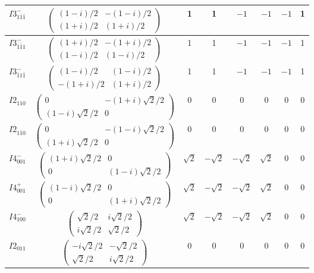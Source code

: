 \documentclass[3p,preprint]{elsarticle}
\begin{document}
\begin{table}[H]
{\begin{tabular}{|c|c||c|c|c|c|c|c|}
			$I3^{-}_{1\bar{1}\bar{1}}$ &		$\left(\begin{array}{cc} (1-i)/2&-(1-i)/2 \\ (1+i)/2&(1+i)/2 \end{array}\right)$	&1 & 1 & $-1$ & $-1$ & $-1$ & 1 \\ \hline
			$I3^{-}_{\bar{1}\bar{1}1}$ &		$\left(\begin{array}{cc} (1+i)/2&-(1+i)/2 \\ (1-i)/2&(1-i)/2 \end{array}\right)$	&1 & 1 & $-1$ & $-1$ & $-1$ & 1 \\ \hline
			$I3^{-}_{\bar{1}1\bar{1}}$ &		$\left(\begin{array}{cc} (1-i)/2&(1-i)/2 \\ -(1+i)/2&(1+i)/2 \end{array}\right)$	&1 & 1 & $-1$ & $-1$ & $-1$ & 1 \\ \hline
			$I2_{110}$ &		$\left(\begin{array}{cc} 0&-(1+i)\sqrt{2}/2 \\ (1-i)\sqrt{2}/2&0 \end{array}\right)$	&$0$ & $0$ & $0$ & $0$ & $0$ & $0$ \\ \hline
			$I2_{1\bar{1}0}$ &		$\left(\begin{array}{cc} 0&-(1-i)\sqrt{2}/2 \\ (1+i)\sqrt{2}/2&0 \end{array}\right)$	&$0$ & $0$ & $0$ & $0$ & $0$ & $0$ \\ \hline
			$I4^{-}_{001}$ &		$\left(\begin{array}{cc} (1+i)\sqrt{2}/2&0 \\ 0&(1-i)\sqrt{2}/2 \end{array}\right)$	&$\sqrt{2}$ & $-\sqrt{2}$ & $-\sqrt{2}$ & $\sqrt{2}$ & $0$ & $0$ \\ \hline
			$I4^{+}_{001}$ &		$\left(\begin{array}{cc} (1-i)\sqrt{2}/2&0 \\ 0&(1+i)\sqrt{2}/2 \end{array}\right)$	&$\sqrt{2}$ & $-\sqrt{2}$ & $-\sqrt{2}$ & $\sqrt{2}$ & $0$ & $0$ \\ \hline
			$I4^{-}_{100}$ &		$\left(\begin{array}{cc} \sqrt{2}/2&i\sqrt{2}/2 \\ i\sqrt{2}/2&\sqrt{2}/2 \end{array}\right)$	&$\sqrt{2}$ & $-\sqrt{2}$ & $-\sqrt{2}$ & $\sqrt{2}$ & $0$ & $0$ \\ \hline
			$I2_{011}$ &		$\left(\begin{array}{cc} -i\sqrt{2}/2&-\sqrt{2}/2 \\ \sqrt{2}/2&i\sqrt{2}/2 \end{array}\right)$	&$0$ & $0$ & $0$ & $0$ & $0$ & $0$ \\ \hline

\end{tabular}}
\end{table}
\end{document}
